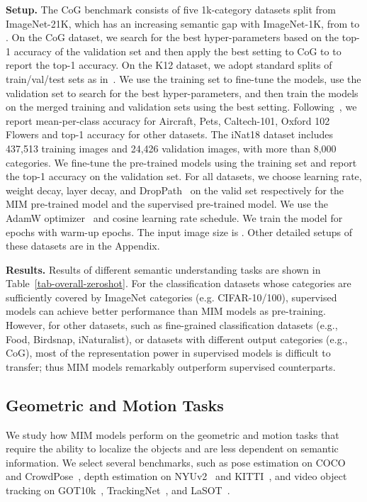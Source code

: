 \documentclass{article}
\begin{document}
\noindent\textbf{Setup.} The CoG benchmark consists of five 1k-category datasets split from ImageNet-21K, which has an increasing semantic gap with ImageNet-1K, from  to .
On the CoG dataset, we search for the best hyper-parameters based on the top-1 accuracy of the   validation set and then apply the best setting to CoG  to  to report the top-1 accuracy.  
On the K12 dataset, we adopt standard splits of train/val/test sets as in~\cite{kornblith2019better}. We use the training set to fine-tune the models, use the validation set to search for the best hyper-parameters, and then train the models on the merged training and validation sets using the best setting. Following~\cite{kornblith2019better}, we report mean-per-class accuracy for Aircraft, Pets, Caltech-101, Oxford 102 Flowers and top-1 accuracy for other datasets. 
The iNat18 dataset includes 437,513 training images and 24,426 validation images, with more than 8,000 categories. We fine-tune the pre-trained models using the training set and report the top-1 accuracy on the validation set. 
For all datasets, we choose learning rate, weight decay, layer decay, and DropPath~\cite{huang2016deep} on the valid set respectively for the MIM pre-trained model and the supervised pre-trained model. We use the AdamW optimizer~\cite{Loshchilov2019adamw} and cosine learning rate schedule. We train the model for  epochs with  warm-up epochs. The input image size is . Other detailed setups of these datasets are in the Appendix.

\noindent\textbf{Results.} Results of different semantic understanding tasks are shown in Table~\ref{tab-overall-zeroshot}.
For the classification datasets whose categories are sufficiently covered by ImageNet categories (e.g. CIFAR-10/100), supervised models can achieve better performance than MIM models as pre-training. However, for other datasets, such as fine-grained classification datasets (e.g., Food, Birdsnap, iNaturalist), or datasets with different output categories (e.g., CoG), most of the representation power in supervised models is difficult to transfer; thus MIM models remarkably outperform supervised counterparts.


\subsection{Geometric and Motion Tasks}
\label{subsection:exp-details}


    We study how MIM models perform on the geometric and motion tasks that require the ability to localize the objects and are less dependent on semantic information. We select several benchmarks, such as pose estimation on COCO~\cite{lin2014microsoft} and CrowdPose~\cite{li2019crowd},  depth estimation on NYUv2~\cite{nathan2012nyuv2} and KITTI~\cite{andreas2013kitti}, and video object tracking on GOT10k~\cite{huang2021got10k}, TrackingNet~\cite{muller2018tracknet}, and LaSOT~\cite{fan2019lasot}.
\end{document}
